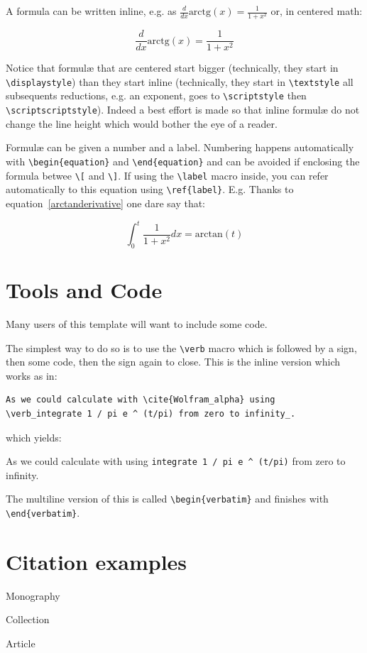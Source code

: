 A formula can be written inline, e.g. as $ \frac{d}{dx}\mbox{arctg}(x) = \frac{1}{1+x^2}$ or, in centered math:

\begin{equation}  \frac{d}{dx}\mbox{arctg}(x) = \frac{1}{1+x^2} \label{arctanderivative}\end{equation}

Notice that formulæ that are centered start bigger (technically, they start in \verb+\displaystyle+) than they start inline (technically, they start in \verb+\textstyle+ all subsequents reductions, e.g. an exponent, goes to \verb+\scriptstyle+ then \verb+\scriptscriptstyle+). Indeed a best effort is made so that inline formulæ do not change the line height which would bother the eye of a reader.

Formulæ can be given a number and a label. Numbering happens automatically with \verb+\begin{equation}+ and \verb+\end{equation}+ and can be avoided if enclosing the formula betwee \verb+\[+ and \verb+\]+. If using the \verb+\label+ macro inside, you can refer automatically to this equation using \verb+\ref{label}+. E.g. Thanks to equation~\ref{arctanderivative} one dare say that:

\begin{equation} \int_0^t \frac{1}{1+x^2} dx = \mbox{arctan}(t) \end{equation}


\section{Tools and Code}

Many users of this template will want to include some code.

The simplest way to do so is to use the \verb+\verb+ macro which is followed by a sign, then some code, then the sign again to close. This is the inline version which works as in: 


\begin{verbatim}
As we could calculate with \cite{Wolfram_alpha} using 
\verb_integrate 1 / pi e ^ (t/pi) from zero to infinity_.
\end{verbatim}

which yields: 

As we could calculate with \cite{Wolfram_alpha} using \verb_integrate 1 / pi e ^ (t/pi)_ from zero to infinity.


The multiline version of this is called \verb+\begin{verbatim}+ and finishes with \verb+\end{verbatim}+.


\section{Citation examples}

Monography \citep[][S. 22]{con:infra} 

Collection \citep{sammelband} 

Article \citep{article1}
